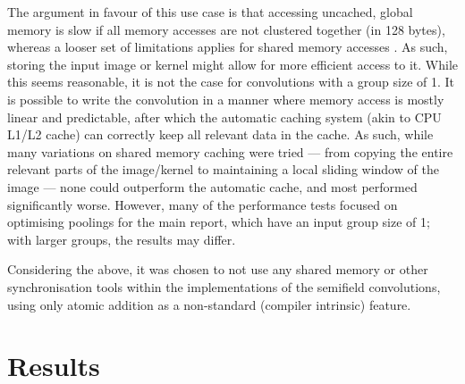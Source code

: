 \documentclass[a4paper, 12pt, openright]{report}
\begin{document}
The argument in favour of this use case is that accessing uncached, global memory is slow if all memory accesses are not clustered together (in 128 bytes), whereas a looser set of limitations applies for shared memory accesses \cite{cuda}. As such, storing the input image or kernel might allow for more efficient access to it. While this seems reasonable, it is not the case for convolutions with a group size of 1. It is possible to write the convolution in a manner where memory access is mostly linear and predictable, after which the automatic caching system (akin to CPU L1/L2 cache) can correctly keep all relevant data in the cache. As such, while many variations on shared memory caching were tried --- from copying the entire relevant parts of the image/kernel to maintaining a local sliding window of the image --- none could outperform the automatic cache, and most performed significantly worse. However, many of the performance tests focused on optimising poolings for the main report, which have an input group size of 1; with larger groups, the results may differ.

Considering the above, it was chosen to not use any shared memory or other synchronisation tools within the implementations of the semifield convolutions, using only atomic addition as a non-standard (compiler intrinsic) feature.

\chapter{Results}
\end{document}
